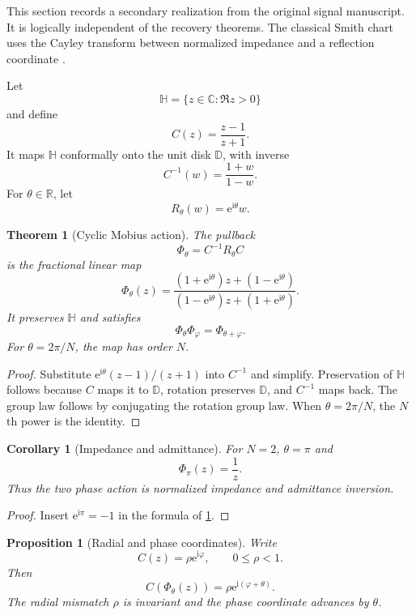 \documentclass{aomart}
\newtheorem{theorem}{Theorem}[section]
\newtheorem{proposition}[proposition]{Proposition}
\newtheorem{corollary}[corollary]{Corollary}
\theoremstyle{definition}
\theoremstyle{remark}
\newcommand{\CC}{\mathbb C}
\newcommand{\RR}{\mathbb R}
\newcommand{\e}{\mathrm e}
\newcommand{\ii}{\mathrm i}
\begin{document}
This section records a secondary realization from the original signal manuscript. It is logically independent of the recovery theorems. The classical Smith chart uses the Cayley transform between normalized impedance and a reflection coordinate \cite{Smith1969}.

Let
\[
\mathbb H
=
\{z\in\CC:\Re z>0\}
\]
and define
\[
C(z)=\frac{z-1}{z+1}.
\]
It maps \(\mathbb H\) conformally onto the unit disk \(\mathbb D\), with inverse
\[
C^{-1}(w)=\frac{1+w}{1-w}.
\]
For \(\theta\in\RR\), let
\[
R_\theta(w)=\e^{\ii\theta}w.
\]

\begin{theorem}[Cyclic Mobius action]\label{thm:cyclic_mobius}
The pullback
\[
\Phi_\theta
=C^{-1}R_\theta C
\]
is the fractional linear map
\[
\boxed{
\Phi_\theta(z)
=
\frac{(1+\e^{\ii\theta})z+(1-\e^{\ii\theta})}
{(1-\e^{\ii\theta})z+(1+\e^{\ii\theta})}.
}
\]
It preserves \(\mathbb H\) and satisfies
\[
\Phi_\theta\Phi_\varphi
=
\Phi_{\theta+\varphi}.
\]
For \(\theta=2\pi/N\), the map has order \(N\).
\end{theorem}

\begin{proof}
Substitute \(\e^{\ii\theta}(z-1)/(z+1)\) into \(C^{-1}\) and simplify. Preservation of \(\mathbb H\) follows because \(C\) maps it to \(\mathbb D\), rotation preserves \(\mathbb D\), and \(C^{-1}\) maps back. The group law follows by conjugating the rotation group law. When \(\theta=2\pi/N\), the \(N\)th power is the identity.
\end{proof}

\begin{corollary}[Impedance and admittance]\label{cor:impedance_admittance}
For \(N=2\), \(\theta=\pi\) and
\[
\Phi_\pi(z)=\frac1z.
\]
Thus the two phase action is normalized impedance and admittance inversion.
\end{corollary}

\begin{proof}
Insert \(\e^{\ii\pi}=-1\) in the formula of \cref{thm:cyclic_mobius}.
\end{proof}

\begin{proposition}[Radial and phase coordinates]\label{prop:radial_phase}
Write
\[
C(z)=\rho\e^{\ii\varphi},
\qquad
0\leq\rho<1.
\]
Then
\[
C(\Phi_\theta(z))
=
\rho\e^{\ii(\varphi+\theta)}.
\]
The radial mismatch \(\rho\) is invariant and the phase coordinate advances by \(\theta\).
\end{proposition}
\end{document}

